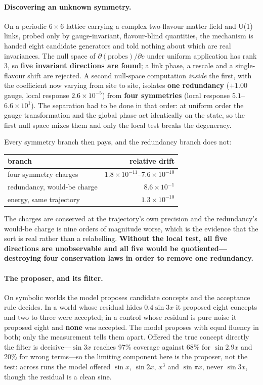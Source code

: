 \documentclass[aps,pra,twocolumn,superscriptaddress,nofootinbib,10pt]{revtex4-2}
\begin{document}
\paragraph{Discovering an unknown symmetry.} On a periodic $6\times6$ lattice carrying a complex
two-flavour matter field and U(1) links, probed only by gauge-invariant, flavour-blind
quantities, the mechanism is handed eight candidate generators and told nothing about which are
real invariances. The null space of $\partial(\text{probes})/\partial c$ under uniform
application has rank 3, so \textbf{five invariant directions are found}; a link phase, a rescale
and a single-flavour shift are rejected. A second null-space computation \emph{inside} the first,
with the coefficient now varying from site to site, isolates \textbf{one redundancy}
($+1.00\,$gauge, local response $2.6{\times}10^{-5}$) from \textbf{four symmetries} (local
response $5.1$--$6.6{\times}10^{1}$). The separation had to be done in that order: at uniform
order the gauge transformation and the global phase act identically on the state, so the first
null space mixes them and only the local test breaks the degeneracy.

Every symmetry branch then pays, and the redundancy branch does not:

\begin{center}\footnotesize
\begin{tabular}{@{}lr@{}}
\toprule
branch & relative drift \\
\midrule
four symmetry charges & $1.8\!\times\!10^{-11}$--$7.6\!\times\!10^{-10}$ \\
redundancy, would-be charge & $8.6\!\times\!10^{-1}$ \\
\midrule
energy, same trajectory & $1.3\!\times\!10^{-10}$ \\
\bottomrule
\end{tabular}
\end{center}

The charges are conserved at the trajectory's own precision and the redundancy's would-be charge
is nine orders of magnitude worse, which is the evidence that the sort is real rather than a
relabelling. \textbf{Without the local test, all five directions are unobservable and all five
would be quotiented---destroying four conservation laws in order to remove one redundancy.}

\paragraph{The proposer, and its filter.} On symbolic worlds the model proposes candidate
concepts and the acceptance rule decides. In a world whose residual hides $0.4\sin 3x$ it
proposed eight concepts and two to three were accepted; in a control whose residual is pure noise
it proposed eight and \textbf{none} was accepted. The model proposes with equal fluency in both;
only the measurement tells them apart. Offered the true concept directly the filter is
decisive---$\sin 3x$ reaches 97\% coverage against 68\% for $\sin 2.9x$ and 20\% for wrong
terms---so the limiting component here is the proposer, not the test: across runs the model
offered $\sin x$, $\sin 2x$, $x^{3}$ and $\sin\pi x$, never $\sin 3x$, though the residual is a
clean sine.
\end{document}
